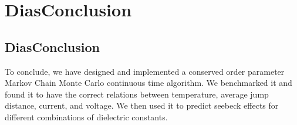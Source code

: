 \chapter{DiasConclusion}          %
\label{codechap}
\section{DiasConclusion}

To conclude, we have designed and implemented a conserved order parameter Markov Chain Monte Carlo continuous time algorithm. We benchmarked it and found it to have the correct relations between temperature, average jump distance, current, and voltage. We then used it to predict seebeck effects for different combinations of dielectric constants. 
